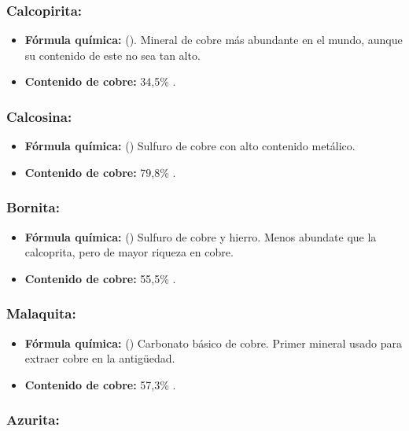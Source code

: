 \documentclass[12pt,a4paper]{article}
\begin{document}
\subsubsection{Calcopirita:}

\begin{itemize}
    \item \textbf{Fórmula química:} (). Mineral de cobre más abundante en el mundo, aunque su contenido de este no sea tan alto.
    \item \textbf{Contenido de cobre:} 34,5\% .
\end{itemize}

\subsubsection{Calcosina:}

\begin{itemize}
    \item \textbf{Fórmula química:} () Sulfuro de cobre con alto contenido metálico.
    \item \textbf{Contenido de cobre:} 79,8\% .
\end{itemize}

\subsubsection{Bornita:}

\begin{itemize}
    \item \textbf{Fórmula química:} () Sulfuro de cobre y hierro. Menos abundate que la calcoprita, pero de mayor riqueza en cobre.
    \item \textbf{Contenido de cobre:} 55,5\% .
\end{itemize}

\subsubsection{Malaquita:}

\begin{itemize}
    \item \textbf{Fórmula química:} () Carbonato básico de cobre. Primer mineral usado para extraer cobre en la antigüedad.
    \item \textbf{Contenido de cobre:} 57,3\% .
\end{itemize}

\subsubsection{Azurita:}
\end{document}
